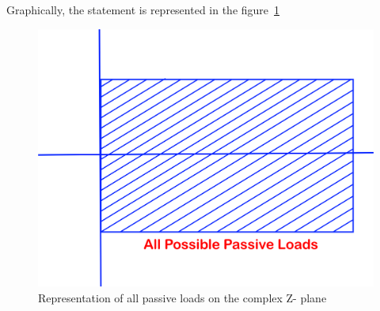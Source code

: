 Graphically, the statement is represented in the figure~\ref{fig:oigvbnkliu}
\begin{figure}[h]
\centering
\includegraphics[width=0.6\linewidth]{graphics/oigvbnkliu}
\caption{Representation of all passive loads on the complex Z- plane}
\label{fig:oigvbnkliu}
\end{figure}

